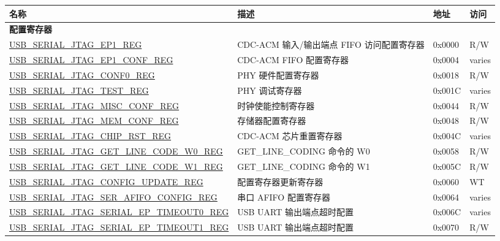 \begin{longtable}{ | p{7.4cm} | p{5.2cm} | p{1.2cm} | p{1.7cm} | }
    \hline\rowcolor{lightgray}
    \textbf{名称} & \textbf{描述} &  \textbf{地址} & \textbf{访问} \\ \hline
    \endhead
    \multicolumn{4}{|l|}{\textbf{配置寄存器}} \\ \hline
    \hyperref[regdesc:USBSERIALJTAGEP1REG]{USB\_SERIAL\_JTAG\_EP1\_REG} & CDC-ACM 输入/输出端点 FIFO 访问配置寄存器 & 0x0000 & R/W \\ \hline
    \hyperref[regdesc:USBSERIALJTAGEP1CONFREG]{USB\_SERIAL\_JTAG\_EP1\_CONF\_REG} & CDC-ACM FIFO 配置寄存器 & 0x0004 & varies \\ \hline
    \hyperref[regdesc:USBSERIALJTAGCONF0REG]{USB\_SERIAL\_JTAG\_CONF0\_REG} & PHY 硬件配置寄存器 & 0x0018 & R/W \\ \hline
    \hyperref[regdesc:USBSERIALJTAGTESTREG]{USB\_SERIAL\_JTAG\_TEST\_REG} & PHY 调试寄存器 & 0x001C & varies \\ \hline
    \hyperref[regdesc:USBSERIALJTAGMISCCONFREG]{USB\_SERIAL\_JTAG\_MISC\_CONF\_REG} & 时钟使能控制寄存器 & 0x0044 & R/W \\ \hline
    \hyperref[regdesc:USBSERIALJTAGMEMCONFREG]{USB\_SERIAL\_JTAG\_MEM\_CONF\_REG} & 存储器配置寄存器 & 0x0048 & R/W \\ \hline
    \hyperref[regdesc:USBSERIALJTAGCHIPRSTREG]{USB\_SERIAL\_JTAG\_CHIP\_RST\_REG} & CDC-ACM 芯片重置寄存器 & 0x004C & varies \\ \hline
    \hyperref[regdesc:USBSERIALJTAGGETLINECODEW0REG]{USB\_SERIAL\_JTAG\_GET\_LINE\_CODE\_W0\_REG} & GET\_LINE\_CODING 命令的 W0 & 0x0058 & R/W \\ \hline
    \hyperref[regdesc:USBSERIALJTAGGETLINECODEW1REG]{USB\_SERIAL\_JTAG\_GET\_LINE\_CODE\_W1\_REG} & GET\_LINE\_CODING 命令的 W1 & 0x005C & R/W \\ \hline
    \hyperref[regdesc:USBSERIALJTAGCONFIGUPDATEREG]{USB\_SERIAL\_JTAG\_CONFIG\_UPDATE\_REG} & 配置寄存器更新寄存器 & 0x0060 & WT \\ \hline
    \hyperref[regdesc:USBSERIALJTAGSERAFIFOCONFIGREG]{USB\_SERIAL\_JTAG\_SER\_AFIFO\_CONFIG\_REG} & 串口 AFIFO 配置寄存器 & 0x0064 & varies \\ \hline
    \hyperref[regdesc:USBSERIALJTAGSERIALEPTIMEOUT0REG]{USB\_SERIAL\_JTAG\_SERIAL\_EP\_TIMEOUT0\_REG} & USB UART 输出端点超时配置 & 0x006C & varies \\ \hline
    \hyperref[regdesc:USBSERIALJTAGSERIALEPTIMEOUT1REG]{USB\_SERIAL\_JTAG\_SERIAL\_EP\_TIMEOUT1\_REG} & USB UART 输出端点超时配置 & 0x0070 & R/W \\ \hline

\end{longtable}
